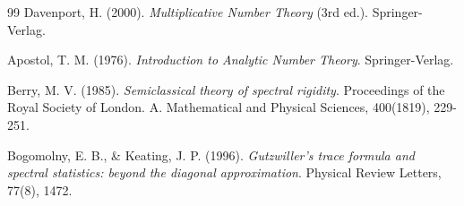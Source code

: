 \documentclass[12pt, a4paper]{article}
\theoremstyle{plain}
\theoremstyle{definition}
\begin{document}
\begin{thebibliography}{99}
 Davenport, H. (2000). \textit{Multiplicative Number Theory} (3rd ed.). Springer-Verlag.

 Apostol, T. M. (1976). \textit{Introduction to Analytic Number Theory}. Springer-Verlag.

 Berry, M. V. (1985). \textit{Semiclassical theory of spectral rigidity}. Proceedings of the Royal Society of London. A. Mathematical and Physical Sciences, 400(1819), 229-251.

 Bogomolny, E. B., \& Keating, J. P. (1996). \textit{Gutzwiller's trace formula and spectral statistics: beyond the diagonal approximation}. Physical Review Letters, 77(8), 1472.

\end{thebibliography}
\end{document}
